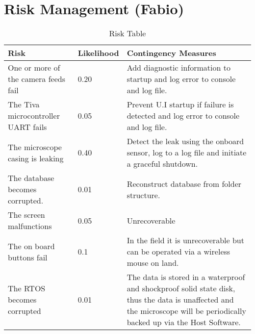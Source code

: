  \section{Risk Management (Fabio)}
 \begin{table}
   \begin{tabular}{|m{}|m{}|m{}|}
     \hline
     \textbf{Risk}&\textbf{Likelihood}&\textbf{Contingency Measures}\\ \hline
     One or more of the camera feeds fail&0.20&Add diagnostic information to startup and log error to console and log file.\\ \hline
     The Tiva microcontroller UART fails&0.05&Prevent U.I startup if failure is detected and log error to console and log file.\\ \hline
     The microscope casing is leaking&0.40&Detect the leak using the onboard sensor, log to a log file and initiate a graceful shutdown. \\ \hline
     The database becomes corrupted.&0.01&Reconstruct database from folder structure.\\ \hline
     The screen malfunctions&0.05&Unrecoverable\\ \hline
     The on board buttons fail&0.1&In the field it is unrecoverable but can be operated via a wireless mouse on land.\\ \hline
     The RTOS becomes corrupted&0.01&The data is stored in a waterproof and shockproof solid state disk, thus the data is unaffected and the microscope will be periodically backed up via the Host Software.\\ \hline
   \end{tabular}
   \caption{Risk Table}
   \label{tab:RiskTable}
 \end{table}
